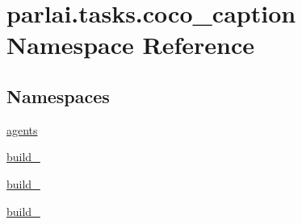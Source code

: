 \hypertarget{namespaceparlai_1_1tasks_1_1coco__caption}{}\section{parlai.\+tasks.\+coco\+\_\+caption Namespace Reference}
\label{namespaceparlai_1_1tasks_1_1coco__caption}
\subsection*{Namespaces}
\begin{DoxyCompactItemize}
\item 
 \hyperlink{namespaceparlai_1_1tasks_1_1coco__caption_1_1agents}{agents}
\item 
 \hyperlink{namespaceparlai_1_1tasks_1_1coco__caption_1_1build__2014}{build\+\_}
\item 
 \hyperlink{namespaceparlai_1_1tasks_1_1coco__caption_1_1build__2015}{build\+\_}
\item 
 \hyperlink{namespaceparlai_1_1tasks_1_1coco__caption_1_1build__2017}{build\+\_}
\end{DoxyCompactItemize}
